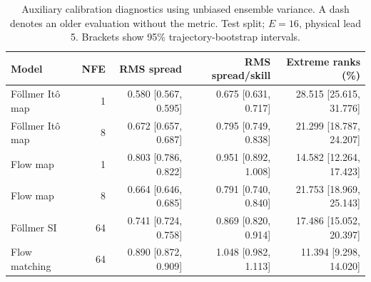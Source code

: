 \begin{table}[t]
\centering
\small
\setlength{\tabcolsep}{3pt}
\caption{Auxiliary calibration diagnostics using unbiased ensemble variance. A dash denotes an older evaluation without the metric. Test split; $E=16$, physical lead 5. Brackets show 95\% trajectory-bootstrap intervals.}
\label{tab:map-rms-calibration}
\begin{tabular}{lrrrr}
\toprule
Model & NFE & RMS spread & RMS spread/skill & Extreme ranks (\%) \\
\midrule
Föllmer Itô map & 1 & 0.580 [0.567, 0.595] & 0.675 [0.631, 0.717] & 28.515 [25.615, 31.776] \\
Föllmer Itô map & 8 & 0.672 [0.657, 0.687] & 0.795 [0.749, 0.838] & 21.299 [18.787, 24.207] \\
\addlinespace
Flow map & 1 & 0.803 [0.786, 0.822] & 0.951 [0.892, 1.008] & 14.582 [12.264, 17.423] \\
Flow map & 8 & 0.664 [0.646, 0.685] & 0.791 [0.740, 0.840] & 21.753 [18.969, 25.143] \\
\addlinespace
Föllmer SI & 64 & 0.741 [0.724, 0.758] & 0.869 [0.820, 0.914] & 17.486 [15.052, 20.397] \\
\addlinespace
Flow matching & 64 & 0.890 [0.872, 0.909] & 1.048 [0.982, 1.113] & 11.394 [9.298, 14.020] \\
\bottomrule
\end{tabular}
\end{table}
